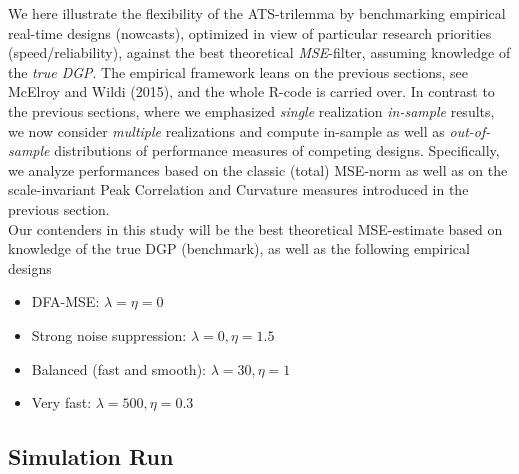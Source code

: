 \documentclass[a4paper]{book}
\begin{document}
We here illustrate the flexibility of the ATS-trilemma by benchmarking empirical real-time designs (nowcasts), optimized in view of particular research priorities (speed/reliability), against the best theoretical \emph{MSE}-filter, assuming knowledge of the \emph{true DGP}. The empirical framework leans on the previous sections, see McElroy and Wildi (2015), and the whole R-code is carried over. In contrast to the previous sections, where we emphasized \emph{single} realization \emph{in-sample} results, we now consider \emph{multiple} realizations and compute in-sample as well as \emph{out-of-sample} {distributions} of performance measures of competing designs. Specifically, we analyze performances based on the classic (total) MSE-norm as well as on the scale-invariant Peak Correlation and Curvature measures introduced in the previous section. \\

Our contenders in this study will be the best theoretical MSE-estimate based on knowledge of the true DGP (benchmark), as well as the following empirical designs
\begin{itemize}
\item DFA-MSE: $\lambda=\eta=0$
\item Strong noise suppression: $\lambda=0,\eta=1.5$
\item Balanced (fast and smooth): $\lambda=30,\eta=1$
\item Very fast: $\lambda=500,\eta=0.3$
\end{itemize}



\subsection{Simulation Run}
\end{document}
